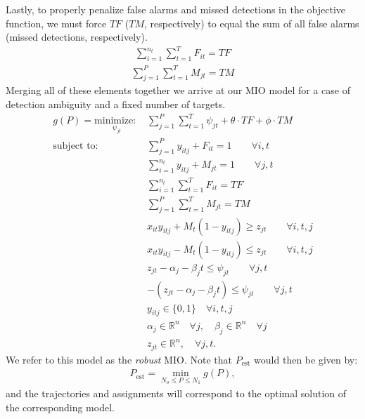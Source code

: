 Lastly, to properly penalize false alarms and missed detections in the objective function, we must force $TF$ ($TM$, respectively) to equal the sum of all false alarms (missed detections, respectively).
\begin{align*}
\sum_{i=1}^{n_{t}} \sum_{t=1}^{T} F_{it} = TF
\end{align*}
\begin{align}\label{eqn: MD Total}
\sum_{j=1}^{P} \sum_{t=1}^{T} M_{jt} = TM 
\end{align}
\vfill
{}
Merging all of these elements together we arrive at our MIO model for a case of detection ambiguity and a fixed number of targets. 
\begin{align}
g(P)=\underset{\psi_{jt}}{\text{minimize: }} & \sum_{j=1}^{P} \sum_{t=1}^{T} \psi_{jt} + \theta \cdot TF + \phi \cdot TM \label{eq:simple_robust}\\
\text{subject to: }	& \sum_{j=1}^{P} y_{itj} + F_{it} = 1 \qquad \forall i,t \nonumber \\
				& \sum_{i=1}^{n_{t}} y_{itj} + M_{jt} = 1 \qquad \forall j,t \nonumber\\
				& \sum_{i=1}^{n_{t}} \sum_{t=1}^{T} F_{it} = TF \nonumber \\
				& \sum_{j=1}^{P} \sum_{t=1}^{T} M_{jt} = TM \nonumber \\
				& x_{it}y_{itj} + M_{t}(1-y_{itj}) \geq z_{jt} \qquad \forall i,t,j \nonumber \\
				& x_{it}y_{itj} - M_{t}(1-y_{itj}) \leq z_{jt} \qquad \forall i,t,j \nonumber \\
				& z_{jt} - \alpha_{j} - \beta_{j}t \leq \psi_{jt} \qquad \forall j,t \nonumber \\
				& -(z_{jt} - \alpha_{j} - \beta_{j}t) \leq \psi_{jt} \qquad \forall j,t \nonumber \\
				& y_{itj} \in \{0,1\} \quad \forall i,t,j \nonumber \\
				& \alpha_{j} \in \mathbb{R}^n \quad \forall j ,\quad \beta_{j} \in \mathbb{R}^n \quad \forall j \nonumber\\
				& z_{jt} \in \mathbb{R}^n, \quad \forall j,t. \nonumber
\end{align}
We refer to this model as the \textit{robust} MIO. Note that $P_\text{est}$ would then be given by:
\begin{align*}
P_\text{est}=\min_{N_o\leq P\leq N_1} g(P),
\end{align*}
and the trajectories and assignments will correspond to the optimal solution of the corresponding model.
